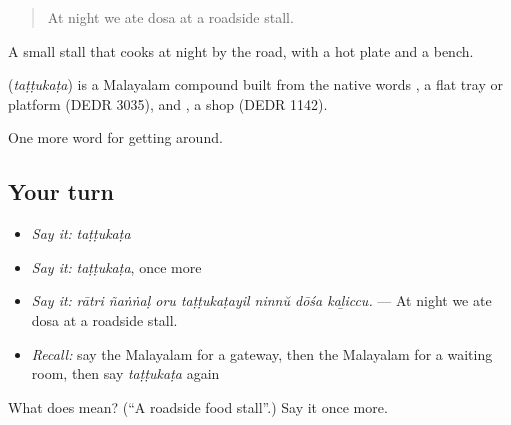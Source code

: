 \begin{quote}
At night we ate dosa at a roadside stall.
\end{quote}

A small stall that cooks at night by the road, with a hot plate and a bench.

\begin{cousinweb}
\textbf{} (\emph{taṭṭukaṭa}) is a Malayalam compound built from the native words , a flat tray or platform (DEDR 3035), and , a shop (DEDR 1142).
\end{cousinweb}

\begin{grammarlens}[title={What you've built}]
One more word for getting around.
\end{grammarlens}

\subsection*{Your turn}
\begin{itemize}
\raggedright
  \item \emph{Say it:} \emph{taṭṭukaṭa}
  \item \emph{Say it:} \emph{taṭṭukaṭa}, once more
  \item \emph{Say it:} \emph{rātri ñaṅṅaḷ oru taṭṭukaṭayil ninnŭ dōśa kaḻiccu.} — At night we ate dosa at a roadside stall.
  \item \emph{Recall:} say the Malayalam for a gateway, then the Malayalam for a waiting room, then say \emph{taṭṭukaṭa} again
\end{itemize}

\begin{tcolorbox}[breakable,colback=teal!4,colframe=teal!35!black,title={Before you move on}]
What does  mean? (\textquotedblleft{}A roadside food stall\textquotedblright{}.) Say it once more.
\end{tcolorbox}
